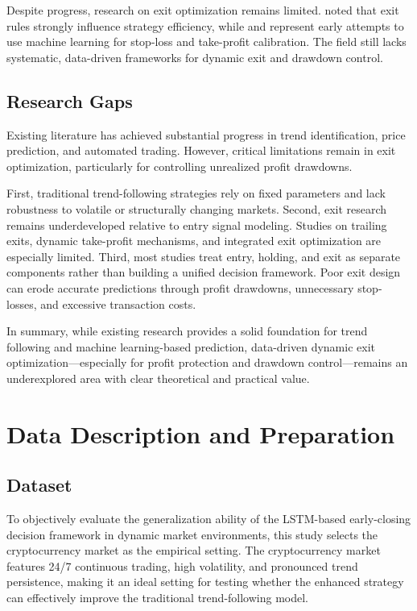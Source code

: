 \documentclass[12pt]{article}
\begin{document}
Despite progress, research on exit optimization remains limited. \citet{HwangEtAl2023} noted that exit rules strongly influence strategy efficiency, while \citet{SivriEtAl2023} and \citet{Shawky2023} represent early attempts to use machine learning for stop-loss and take-profit calibration. The field still lacks systematic, data-driven frameworks for dynamic exit and drawdown control.

\subsection{Research Gaps}

Existing literature has achieved substantial progress in trend identification, price prediction, and automated trading. However, critical limitations remain in exit optimization, particularly for controlling unrealized profit drawdowns.

First, traditional trend-following strategies rely on fixed parameters and lack robustness to volatile or structurally changing markets. Second, exit research remains underdeveloped relative to entry signal modeling. Studies on trailing exits, dynamic take-profit mechanisms, and integrated exit optimization are especially limited. Third, most studies treat entry, holding, and exit as separate components rather than building a unified decision framework. Poor exit design can erode accurate predictions through profit drawdowns, unnecessary stop-losses, and excessive transaction costs.

In summary, while existing research provides a solid foundation for trend following and machine learning-based prediction, data-driven dynamic exit optimization—especially for profit protection and drawdown control—remains an underexplored area with clear theoretical and practical value.

\section{Data Description and Preparation}\label{sec:data}

\subsection{Dataset}

To objectively evaluate the generalization ability of the LSTM-based early-closing decision framework in dynamic market environments, this study selects the cryptocurrency market as the empirical setting. The cryptocurrency market features 24/7 continuous trading, high volatility, and pronounced trend persistence, making it an ideal setting for testing whether the enhanced strategy can effectively improve the traditional trend-following model.
\end{document}
